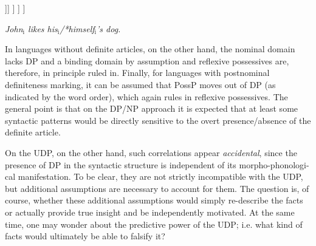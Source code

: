 \documentclass[output=paper,
modfonts
]{langscibook}
\begin{document}
	\ea \label{ex:despic:4}
	\ea 
	\begin{forest}
		[\textbf{DP}
		[\textbf{D}\\\textit{\textbf{the}}]
		[PossP
		[*Reflexive
		] 
		[Poss'[Poss
		][NP[{},roof]]]
		]
		]
		]
	\end{forest}
	
	\ex \textit{John\textnormal{$_\text{i}$} likes his\textnormal{$_\text{i}$}\textnormal{/*}himself\textnormal{$_\text{i}$}'s dog.}
	\z
	\z
	
	In languages without definite articles, on the other hand, the nominal domain lacks DP and a binding domain by assumption and reflexive possessives are, therefore, in principle ruled in. Finally, for languages with postnominal definiteness marking, it can be assumed that PossP moves out of DP (as indicated by the word order), which again rules in reflexive possessives.  The general point is that on the DP/NP approach it is expected that at least some syntactic patterns would be directly sensitive to the overt presence/absence of the definite article.  
	
	On the UDP, on the other hand, such correlations appear \textit{accidental}, since the presence of DP in the syntactic structure is independent of its morpho-phonologi\hyp{}cal manifestation.  To be clear, they are not strictly incompatible with the UDP, but additional assumptions are necessary to account for them. The question is, of course, whether these additional assumptions would simply re-describe the facts or actually provide true insight and be independently motivated.  At the same time, one may wonder about the predictive power of the UDP; i.e. what kind of facts would ultimately be able to falsify it?  
	
\end{document}
